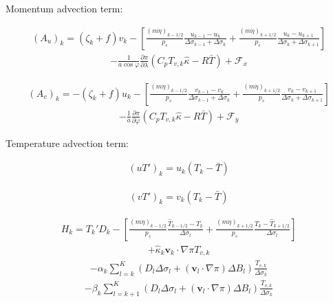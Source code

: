 Momentum advection term:

\begin{eqnarray}
  (A_u)_k
    =  ( \zeta_k + f ) v_k 
             - \left[ \frac{(m\dot{\eta})_{k-1/2}}{p_s} \frac{u_{k-1} - u_k}{\Delta\sigma_{k-1}+\Delta\sigma_k}
               + \frac{(m\dot{\eta})_{k+1/2}}{p_s} \frac{u_k   - u_{k+1}}{\Delta\sigma_{k}+\Delta\sigma_{k+1}} \right]
\end{eqnarray} \begin{eqnarray}
           - \frac{1}{a\cos\varphi} \frac{\partial \pi}{\partial \lambda}(C_p T_{v,k}\hat{\kappa}-R\bar{T})
             + {\mathcal F}_x
\end{eqnarray}

\begin{eqnarray}
  (A_v)_k
    =  - ( \zeta_k + f ) u_k 
             - \left[ \frac{(m\dot{\eta})_{k-1/2}}{p_s} \frac{v_{k-1} - v_k}{\Delta\sigma_{k-1}+\Delta\sigma_k}
               + \frac{(m\dot{\eta})_{k+1/2}}{p_s} \frac{v_k   - v_{k+1}}{\Delta\sigma_{k}+\Delta\sigma_{k+1}} \right]
\end{eqnarray} \begin{eqnarray}
           - \frac{1}{a} \frac{\partial \pi}{\partial \varphi}(C_p T_{v,k}\hat{\kappa}-R\bar{T})
             + {\mathcal F}_y
\end{eqnarray}

Temperature advection term:

\begin{eqnarray}
 (u T')_k  = u_k (T_k - \bar{T} )
\end{eqnarray}

\begin{eqnarray}
 (v T')_k  = v_k (T_k - \bar{T} )
\end{eqnarray}

\begin{eqnarray}
   H_k =  T_k' D_k 
          - \left[ \frac{(m\dot{\eta})_{k-1/2}}{p_s} \frac{\hat{T}_{k-1/2} - T_k}{\Delta \sigma_l}
               + \frac{(m\dot{\eta})_{k+1/2}}{p_s} \frac{T_k - \hat{T}_{k+1/2}}{\Delta \sigma_l} \right]
\end{eqnarray} \begin{eqnarray}
        + \hat{\kappa}_k {\mathbf{v}}_k \cdot \nabla \pi T_{v,k} 
\end{eqnarray} \begin{eqnarray}
        - \alpha_k \sum_{l=k}^{K} 
                           (D_l \Delta \sigma_l + ({\mathbf{v}}_l \cdot \nabla \pi)\Delta B_l)
                            \frac{T_{v,k}}{\Delta \sigma_k} 
\end{eqnarray} \begin{eqnarray}
        - \beta_k \sum_{l=k+1}^{K} 
                           (D_l \Delta \sigma_l + ({\mathbf{v}}_l \cdot \nabla \pi)\Delta B_l)
                            \frac{T_{v,k}}{\Delta \sigma_k}
\end{eqnarray}

